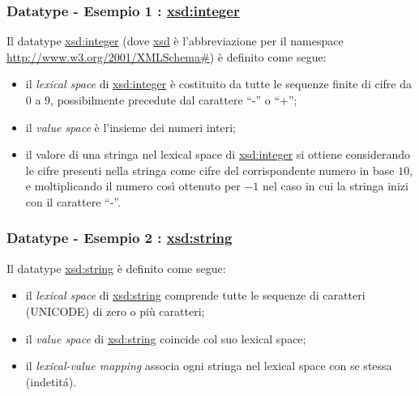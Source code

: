 \documentclass[8pt]{beamer}
\begin{document}
\begin{frame}
  \frametitle{Datatype - Esempio 1 : \url{xsd:integer}}
  Il datatype \url{xsd:integer} (dove \url{xsd} \`e l'abbreviazione per il namespace \url{http://www.w3.org/2001/XMLSchema\#})
  \`e definito come segue:

  \begin{itemize}
    \item il \emph{lexical space} di \url{xsd:integer} \`e costituito da tutte le sequenze finite di cifre da 0 a 9, possibilmente
    precedute dal carattere ``-'' o ``+'';
    \item il \emph{value space} \`e l'insieme dei numeri interi;
    \item il valore di una stringa nel lexical space di \url{xsd:integer} si ottiene considerando le cifre 
    presenti nella stringa come cifre del corrispondente numero in base $10$, e moltiplicando il numero cos\`i ottenuto per
    $-1$ nel caso in cui la stringa inizi con il carattere ``-''.
  \end{itemize}
\end{frame}

\begin{frame}
  \frametitle{Datatype - Esempio 2 : \url{xsd:string}}
  Il datatype \url{xsd:string} \`e definito come segue:

  \begin{itemize}
    \item il \emph{lexical space} di \url{xsd:string} comprende 
    tutte le sequenze di caratteri (UNICODE) di zero o pi\`u caratteri;
    \item il \emph{value space} di \url{xsd:string} coincide col suo 
    lexical space;
    \item il \emph{lexical-value mapping} associa ogni stringa nel lexical space
    con se stessa (indetit\'a).
  \end{itemize}
\end{frame}
\end{document}
